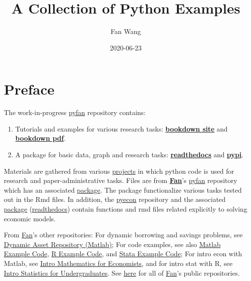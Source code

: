\documentclass[
]{book}
\title{A Collection of Python Examples}
\author{Fan Wang}
\date{2020-06-23}
\providecommand{\tightlist}{%
  \setlength{\itemsep}{0pt}\setlength{\parskip}{0pt}}
\begin{document}
\maketitle

{
\hypersetup{linkcolor=}
\setcounter{tocdepth}{2}
\tableofcontents
}
\hypertarget{preface}{%
\chapter*{Preface}\label{preface}}

The work-in-progress \href{https://github.com/FanWangEcon/pyfan}{pyfan} repository contains:

\begin{enumerate}
\def\labelenumi{\arabic{enumi}.}
\tightlist
\item
  Tutorials and examples for various research tasks: \href{https://fanwangecon.github.io/pyfan/bookdown}{\textbf{bookdown site}} and \href{https://fanwangecon.github.io/pyfan/bookdown/A-Collection-of-Python-Examples.pdf}{\textbf{bookdown pdf}}.
\item
  A package for basic data, graph and research tasks: \href{https://pyfan.readthedocs.io/en/latest/}{\textbf{readthedocs}} and \href{https://pypi.org/project/pyfan/}{\textbf{pypi}}.
\end{enumerate}

Materials are gathered from various \href{https://fanwangecon.github.io/research}{projects} in which python code is used for research and paper-administrative tasks. Files are from \href{https://fanwangecon.github.io/}{\textbf{Fan}}'s \href{https://github.com/FanWangEcon/pyfan}{pyfan} repository which has an associated \href{https://pypi.org/project/pyfan/}{package}. The package functionalize various tasks tested out in the Rmd files. In addition, the \href{https://github.com/FanWangEcon/pyecon}{pyecon} repository and the associated \href{https://pypi.org/project/pyecon/}{package} (\href{https://pyfan.readthedocs.io/en/latest/autoapi/pyfan/index.html\#module-pyfan}{readthedocs}) contain functions and rmd files related explicitly to solving economic models.

From \href{https://fanwangecon.github.io/}{Fan}'s other repositories: For dynamic borrowing and savings problems, see \href{https://fanwangecon.github.io/CodeDynaAsset/}{Dynamic Asset Repository (Matlab)}; For code examples, see also \href{https://fanwangecon.github.io/M4Econ/}{Matlab Example Code}, \href{https://fanwangecon.github.io/R4Econ/}{R Example Code}, and \href{https://fanwangecon.github.io/Stata4Econ/}{Stata Example Code}; For intro econ with Matlab, see \href{https://fanwangecon.github.io/Math4Econ/}{Intro Mathematics for Economists}, and for intro stat with R, see \href{https://fanwangecon.github.io/Stat4Econ/}{Intro Statistics for Undergraduates}. See \href{https://github.com/FanWangEcon}{here} for all of \href{https://fanwangecon.github.io/}{Fan}'s public repositories.
\end{document}
